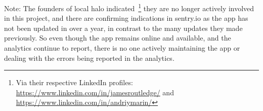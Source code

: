 Note: The founders of local halo indicated~\footnote{Via their respective LinkedIn profiles: \url{https://www.linkedin.com/in/jamesroutledge/} and \url{https://www.linkedin.com/in/andriymarin/}} they are no longer actively involved in this project, and there are confirming indications in sentry.io as the app has not been updated in over a year, in contrast to the many updates they made previously. So even though the app remains online and available, and the analytics continue to report, there is no one actively maintaining the app or dealing with the errors being reported in the analytics.

